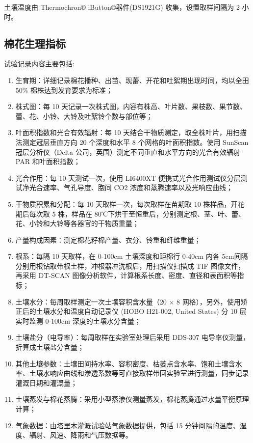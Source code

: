 土壤温度由 Thermochron® iButton®器件(DS1921G) 收集，设置取样间隔为 2 小时。

\subsection{棉花生理指标}
试验记录内容主要包括:
\begin{enumerate}
    \item 生育期：详细记录棉花播种、出苗、现蕾、开花和吐絮期出现时间，均以全田 50\% 棉株达到发育要求为标准；
    \item 株式图：每 10 天记录一次株式图，内容有株高、叶片数、果枝数、果节数、蕾、花、小铃、大铃及吐絮铃个数与部位等；
    \item 叶面积指数和光合有效辐射：每 10 天结合干物质测定，取全株叶片，用扫描法测定冠层垂直方向 20 个深度和水平 8 个网格的叶面积指数。使用 SunScan冠层分析仪（Delta 公司，英国）测定不同垂直和水平方向的光合有效辐射 PAR 和叶面积指数；
    \item 光合作用：每 10 天测试一次，使用 LI6400XT 便携式光合作用测试仪分层测试净光合速率、气孔导度、胞间 CO2 浓度和蒸腾速率以及光响应曲线；
    \item 干物质积累和分配：每 10 天取样一次，每次取样在苗期取 10 株样品，开花期后每次取 5 株，样品在 80℃下烘干至恒重后，分别测定根、茎、叶、蕾、花、小铃和大铃等各器官的干物质重量；
    \item 产量构成因素：测定棉花籽棉产量、衣分、铃重和纤维重量；
    \item 根系：每隔 10 天取样，在 0-100cm 土壤深度和距棉行 0-40cm 内各 5cm间隔分别用根钻取带根土样，冲根器冲洗根后，用扫描仪扫描成 TIF 图像文件，再采用 DT-SCAN 图像分析软件，计算根系长度、密度、直径和表面积等指标；
    \item 土壤水分：每周取样测定一次土壤容积含水量（20 $\times$ 8 网格），另外，使用矫正后的土壤水分和温度自动记录仪 (HOBO H21-002, United States) 分 10 层实时监测 0-100cm 深度的土壤水分含量；
    \item 土壤盐分（电导率）：每周取样在实验室处理后采用 DDS-307 电导率仪测量，折算成土壤盐分含量；
    \item 其他土壤参数：土壤田间持水率、容积密度、枯萎点含水率、饱和土壤含水率、土壤水响应曲线和渗透系数等可直接取样带回实验室进行测量，同步记录灌溉日期和灌溉量；
    \item 土壤蒸发与棉花蒸腾：采用小型蒸渗仪测量蒸发，棉花蒸腾通过水量平衡原理计算；
    \item 气象数据：由塔里木灌溉试验站气象数据提供，包括 15 分钟间隔的温度、湿度、辐射、风速、降雨和气压数据等。
\end{enumerate}

